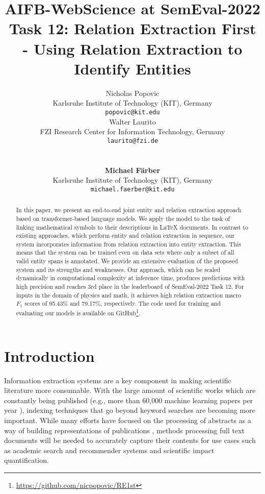 \documentclass[11pt]{article}
\title{AIFB-WebScience at SemEval-2022 Task 12: Relation Extraction First - Using Relation Extraction to Identify Entities}
\author{
  \begin{tabular}{c}
  Nicholas Popovic \\
  \textnormal{Karlsruhe Institute of Technology (KIT), Germany} \\
  {\tt popovic@kit.edu} 
   \end{tabular}\begin{tabular}{c}
  Walter Laurito\\
  \textnormal{FZI Research Center for Information Technology, Germany} \\
  {\tt laurito@fzi.de} 
   \end{tabular} \\[1.5em]
  \begin{tabular}{c}
  \textbf{Michael Färber} \\
  \textnormal{Karlsruhe Institute of Technology (KIT), Germany} \\
  {\tt michael.faerber@kit.edu} 
   \end{tabular}}
\begin{document}
\maketitle
\begin{abstract}
In this paper, we present an end-to-end joint entity and relation extraction approach based on transformer-based language models.
We apply the model to the task of linking mathematical symbols to their descriptions in LaTeX documents.
In contrast to existing approaches, which perform entity and relation extraction in sequence, our system incorporates information from relation extraction into entity extraction.
This means that the system can be trained even on data sets where only a subset of all valid entity spans is annotated.
We provide an extensive evaluation of the proposed system and its strengths and weaknesses.
Our approach, which can be scaled dynamically in computational complexity at inference time, produces predictions with high precision and reaches 3rd place in the leaderboard of SemEval-2022 Task 12.
For inputs in the domain of physics and math, it achieves high relation extraction macro $F_1$ scores of 95.43\% and 79.17\%, respectively.
The code used for training and evaluating our models is available on GitHub\footnote{\url{https://github.com/nicpopovic/RE1st}}. 
\end{abstract}

\section{Introduction}






Information extraction systems are a key component in making scientific literature more consumable.
With the large amount of scientific works which are constantly being published (e.g., more than 60,000 machine learning papers per year \cite{DBLP:conf/semweb/Farber19}), indexing techniques that go beyond keyword searches are becoming more important. 
While many efforts have focused on the processing of abstracts as a way of building representations of publications \cite{gabor_semeval-2018_2018, luan_multi-task_2018}, methods processing full text documents will be needed to accurately capture their contents for use cases such as academic search and recommender systems and scientific impact quantification.
\end{document}
